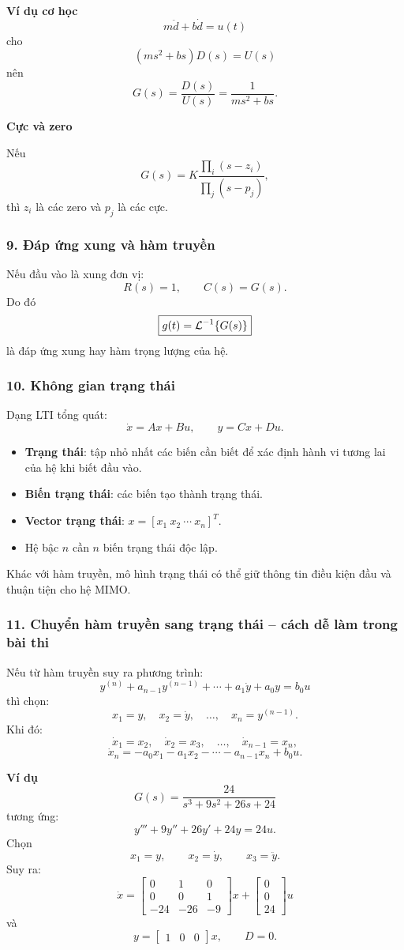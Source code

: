 \textbf{Ví dụ cơ học}
\[
m\ddot d+b\dot d=u(t)
\]
cho
\[
(ms^2+bs)D(s)=U(s)
\]
nên
\[
\boxed{
G(s)=\frac{D(s)}{U(s)}=\frac{1}{ms^2+bs}.
}
\]

\textbf{Cực và zero}

Nếu
\[
G(s)=K\frac{\prod_i(s-z_i)}{\prod_j(s-p_j)},
\]
thì $z_i$ là các zero và $p_j$ là các cực.

\subsubsection*{9. Đáp ứng xung và hàm truyền}

Nếu đầu vào là xung đơn vị:
\[
R(s)=1,\qquad C(s)=G(s).
\]
Do đó
\[
\boxed{
g(t)=\mathcal{L}^{-1}\{G(s)\}
}
\]
là đáp ứng xung hay hàm trọng lượng của hệ.

\subsubsection*{10. Không gian trạng thái}

Dạng LTI tổng quát:
\[
\boxed{
\dot x=Ax+Bu,\qquad y=Cx+Du.
}
\]

\begin{itemize}
  \item \textbf{Trạng thái}: tập nhỏ nhất các biến cần biết để xác định hành vi tương lai của hệ khi biết đầu vào.
  \item \textbf{Biến trạng thái}: các biến tạo thành trạng thái.
  \item \textbf{Vector trạng thái}: $x=[x_1\ x_2\ \cdots\ x_n]^T$.
  \item Hệ bậc $n$ cần $n$ biến trạng thái độc lập.
\end{itemize}

Khác với hàm truyền, mô hình trạng thái có thể giữ thông tin điều kiện đầu và thuận tiện cho hệ MIMO.

\subsubsection*{11. Chuyển hàm truyền sang trạng thái -- cách dễ làm trong bài thi}

Nếu từ hàm truyền suy ra phương trình:
\[
y^{(n)}+a_{n-1}y^{(n-1)}+\cdots+a_1\dot y+a_0y=b_0u
\]
thì chọn:
\[
x_1=y,\quad x_2=\dot y,\quad \ldots,\quad x_n=y^{(n-1)}.
\]
Khi đó:
\[
\dot x_1=x_2,\quad
\dot x_2=x_3,\quad\ldots,\quad
\dot x_{n-1}=x_n,
\]
\[
\dot x_n=-a_0x_1-a_1x_2-\cdots-a_{n-1}x_n+b_0u.
\]

\textbf{Ví dụ}
\[
G(s)=\frac{24}{s^3+9s^2+26s+24}
\]
tương ứng:
\[
y'''+9y''+26y'+24y=24u.
\]
Chọn
\[
x_1=y,\qquad x_2=\dot y,\qquad x_3=\ddot y.
\]
Suy ra:
\[
\boxed{
\dot x=
\begin{bmatrix}
0&1&0\\
0&0&1\\
-24&-26&-9
\end{bmatrix}x+
\begin{bmatrix}
0\\0\\24
\end{bmatrix}u
}
\]
và
\[
\boxed{
y=
\begin{bmatrix}
1&0&0
\end{bmatrix}x,\qquad D=0.
}
\]

